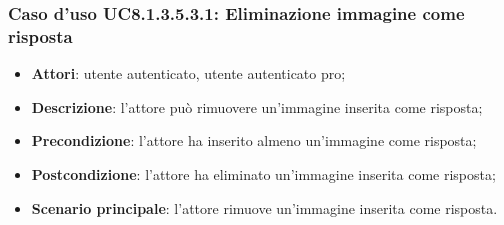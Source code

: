 \subsubsection{Caso d'uso UC8.1.3.5.3.1: Eliminazione immagine come risposta}
\begin{itemize}
	\item\textbf{Attori}: utente autenticato, utente autenticato pro;
	\item\textbf{Descrizione}: l'attore può rimuovere un'immagine inserita come risposta;
	\item\textbf{Precondizione}: l'attore ha inserito almeno un'immagine come risposta; 
	\item \textbf{Postcondizione}: l'attore ha eliminato un'immagine inserita come risposta;
	\item\textbf{Scenario principale}: l'attore rimuove un'immagine inserita come risposta. 
\end{itemize}
